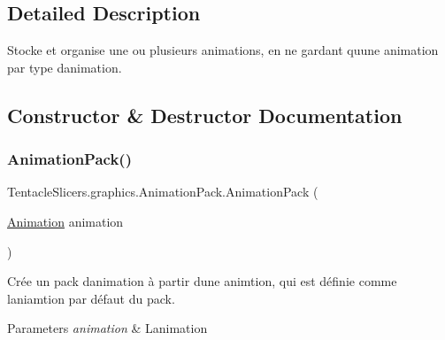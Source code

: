 \subsection{Detailed Description}
Stocke et organise une ou plusieurs animations, en ne gardant qu\textquotesingle{}une animation par type d\textquotesingle{}animation. 



\subsection{Constructor \& Destructor Documentation}
\mbox{\label{class_tentacle_slicers_1_1graphics_1_1_animation_pack_a5285e1eedcba48b991309be20569906f}} 
\subsubsection{\texorpdfstring{Animation\+Pack()}{AnimationPack()}\hspace{0.1cm}{\footnotesize\ttfamily [1/2]}}
{\footnotesize\ttfamily Tentacle\+Slicers.\+graphics.\+Animation\+Pack.\+Animation\+Pack (\begin{DoxyParamCaption}\item[{\hyperlink{class_tentacle_slicers_1_1graphics_1_1_animation}{Animation}}]{animation }\end{DoxyParamCaption})}



Crée un pack d\textquotesingle{}animation à partir d\textquotesingle{}une animtion, qui est définie comme l\textquotesingle{}aniamtion par défaut du pack. 


\begin{DoxyParams}{Parameters}
{\em animation} & L\textquotesingle{}animation \\
\hline
\end{DoxyParams}
\mbox{\label{class_tentacle_slicers_1_1graphics_1_1_animation_pack_a3af88f0914cd8bda260d0faf12f2a1a6}} 
